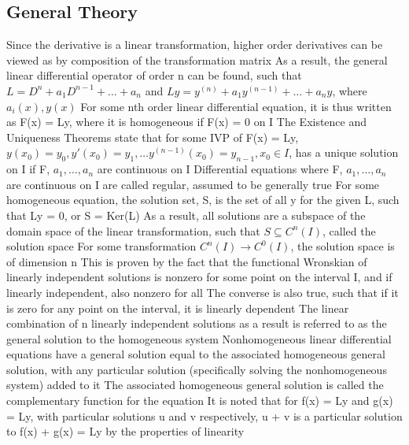 \documentclass[11 pt, twoside]{article}
\newenvironment{outline*}
{
	\begin{outline}[enumerate]
	}
	{\end{outline}
}
\begin{document}
\subsection{General Theory}
\begin{outline*}
\1 Since the derivative is a linear transformation, higher order derivatives can be viewed as by composition of the transformation matrix
\2 As a result, the general linear differential operator of order n can be found, such that $L = D^n + a_1D^{n-1} + \dots + a_n$ and $Ly = y^{(n)} + a_1y^{(n - 1)} + \dots + a_ny$, where $a_i(x), y(x)$
\2 For some nth order linear differential equation, it is thus written as F(x) = Ly, where it is homogeneous if F(x) = 0 on I
\1 The Existence and Uniqueness Theorems state that for some IVP of F(x) = Ly, $y(x_0) = y_0, y'(x_0) = y_1, \dots y^{(n-1)}(x_0) = y_{n-1}, x_0 \in I$, has a unique solution on I if F, $a_1, \dots, a_n$ are continuous on I
\2 Differential equations where F, $a_1, \dots, a_n$ are continuous on I are called regular, assumed to be generally true
\1 For some homogeneous equation, the solution set, S, is the set of all y for the given L, such that Ly = 0, or S = Ker(L)
\2 As a result, all solutions are a subspace of the domain space of the linear transformation, such that $S \subseteq C^n(I)$, called the solution space
\2 For some transformation $C^n(I) \to C^0(I)$, the solution space is of dimension n
\3 This is proven by the fact that the functional Wronskian of linearly independent solutions is nonzero for some point on the interval I, and if linearly independent, also nonzero for all
\4 The converse is also true, such that if it is zero for any point on the interval, it is linearly dependent
\3 The linear combination of n linearly independent solutions as a result is referred to as the general solution to the homogeneous system
\1 Nonhomogeneous linear differential equations have a general solution equal to the associated homogeneous general solution, with any particular solution (specifically solving the nonhomogeneous system) added to it
\2 The associated homogeneous general solution is called the complementary function for the equation
\2 It is noted that for f(x) = Ly and g(x) = Ly, with particular solutions u and v respectively, u + v is a particular solution to f(x) + g(x) = Ly by the properties of linearity
\end{outline*}
\end{document}
